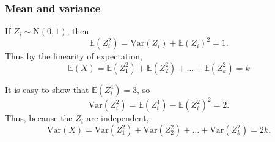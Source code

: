 \documentclass[lecture]{csm}
\newcommand{\expe}{\mathbb{E}}
\newcommand{\var}{\text{Var}}
\begin{document}
\subsubsection*{Mean and variance}
\begin{hidebox}
If $Z_i\sim\text{N}(0,1)$, then 
\[
\expe(Z_i^2) = \var(Z_i)+\expe(Z_i)^2 = 1.
\]
Thus by the linearity of expectation,
\[
\expe(X) = \expe(Z^2_1)+\expe(Z^2_2)+\ldots+\expe(Z^2_k) = k
\]

It is easy to show that $\expe(Z_i^4)=3$, so 
\[
\var(Z_i^2) = \expe(Z_i^4)-\expe(Z_i^2)^2 = 2.
\]
Thus, because the $Z_i$ are independent,
\[
\var(X) = \var(Z^2_1)+\var(Z^2_2)+\ldots+\var(Z^2_k) = 2k.
\]
\end{hidebox}

\end{document}
